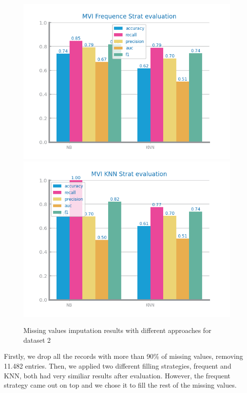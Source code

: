 \documentclass[10pt]{extarticle}
\begin{document}
\begin{figure}[H]
\centering\includegraphics[scale=0.80]{images/dataset2/data_preparation/Credit_Score_mvi_freq_eval.png}
\includegraphics[scale=0.80]{images/dataset2/data_preparation/Credit_Score_mvi_knn_eval.png}
\caption{Missing values imputation results with different approaches for dataset 2}
\end{figure}
Firstly, we drop all the records with more than 90\% of missing values, removing 11.482 entries.
Then, we applied two different filling strategies, frequent and KNN, both had very similiar
results after evaluation. However, the frequent strategy came out on top and we chose it to
fill the rest of the missing values.
\end{document}
